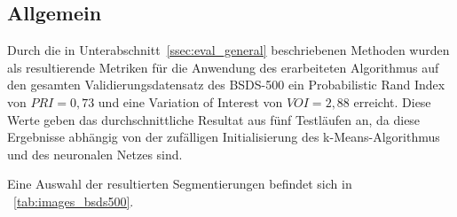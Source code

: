 \subsection{Allgemein}
\label{ssec:results_general}

Durch die in Unterabschnitt~\ref{ssec:eval_general} beschriebenen Methoden wurden als resultierende Metriken für die Anwendung des erarbeiteten Algorithmus auf den gesamten Validierungsdatensatz des BSDS-500 ein Probabilistic Rand Index von $PRI=0,73$ und eine Variation of Interest von $VOI=2,88$ erreicht. Diese Werte geben das durchschnittliche Resultat aus fünf Testläufen an, da diese Ergebnisse abhängig von der zufälligen Initialisierung des k-Means-Algorithmus und des neuronalen Netzes sind.

Eine Auswahl der resultierten Segmentierungen befindet sich in \tablename~\ref{tab:images_bsds500}.

